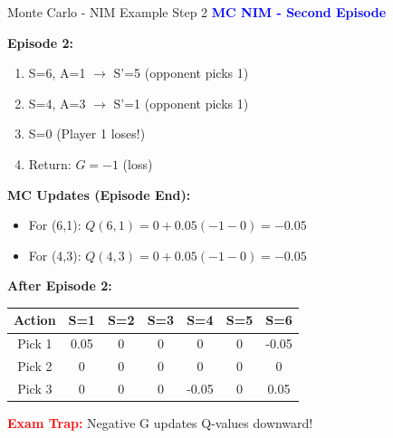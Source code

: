 \documentclass[8pt]{beamer}
\begin{document}
\begin{frame}{Monte Carlo - NIM Example Step 2}
\fontsize{6.5}{7.5}\selectfont
\textcolor{blue}{\textbf{MC NIM - Second Episode}}

\textbf{Episode 2:}
\begin{enumerate}
\item S=6, A=1 $\rightarrow$ S'=5 (opponent picks 1)
\item S=4, A=3 $\rightarrow$ S'=1 (opponent picks 1)
\item S=0 (Player 1 loses!)
\item Return: $G = -1$ (loss)
\end{enumerate}

\textbf{MC Updates (Episode End):}
\begin{itemize}
\item For (6,1): $Q(6,1) = 0 + 0.05(-1 - 0) = -0.05$
\item For (4,3): $Q(4,3) = 0 + 0.05(-1 - 0) = -0.05$
\end{itemize}

\textbf{After Episode 2:}
\begin{tabular}{|c|c|c|c|c|c|c|}
\hline
Action & S=1 & S=2 & S=3 & S=4 & S=5 & S=6 \\
\hline
Pick 1 & 0.05 & 0 & 0 & 0 & 0 & -0.05 \\
\hline
Pick 2 & 0 & 0 & 0 & 0 & 0 & 0 \\
\hline
Pick 3 & 0 & 0 & 0 & -0.05 & 0 & 0.05 \\
\hline
\end{tabular}

\textcolor{red}{\textbf{Exam Trap:}} Negative G updates Q-values downward!
\end{frame}
\end{document}
